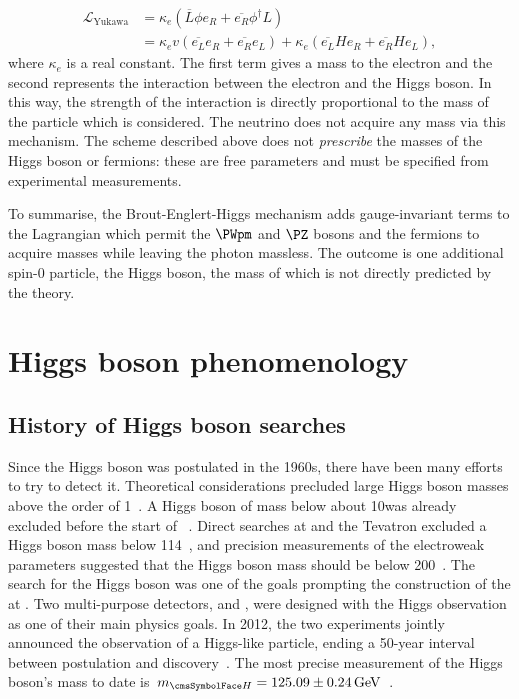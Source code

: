 \begin{equation}
\label{eq:th:yukawa_coupling}
\begin{split}
  \mathcal{L}_{\textrm{Yukawa}} &= \kappa_{e} (\overline{L} \phi  e_{R} + \overline{e_{R}} \phi^{\dagger} L )\\
                       &=  \kappa_{e} v (\overline{e_{L}} e_{R} + \overline{e_{R}} e_{L} ) +  \kappa_{e}   (\overline{e_{L}} H e_{R} + \overline{e_{R}} H e_{L} ),
\end{split}
\end{equation}
where $\kappa_{e}$ is a real constant. The first term gives a mass to the electron and the second represents the interaction between the electron and the Higgs boson. In this way, the strength of the interaction is directly proportional to the mass of the particle which is considered. The neutrino does not acquire any mass via this mechanism. The scheme described above does not \emph{prescribe} the masses of the Higgs boson or fermions: these are free parameters and must be specified from experimental measurements.

To summarise, the Brout-Englert-Higgs mechanism adds gauge-invariant terms to the \SM Lagrangian which permit the $\PWpm$ and $\PZ$ bosons and the fermions to acquire masses while leaving the photon massless. The outcome is one additional spin-0 particle, the Higgs boson, the mass of which is not directly predicted by the theory.

 
\section{Higgs boson phenomenology}
\subsection{History of Higgs boson searches}
\label{sec:th:higgs_searches}

Since the Higgs boson was postulated in the 1960s, there have been many efforts to try to detect it. Theoretical considerations precluded large Higgs boson masses above the order of 1\TeV~\cite{Heller:1993yv}. 
A Higgs boson of mass below about 10\GeV was already excluded before the start of \LEP~\cite{Wu:2014vva}.
Direct searches at \LEP and the Tevatron excluded a Higgs boson mass below 114\GeV~\cite{Barate:2003sz,TEVNPH:2012ab}, and precision measurements of the electroweak parameters suggested that the Higgs boson mass should be below 200\GeV~\cite{Renton:2004wd}. The search for the Higgs boson was one of the goals prompting the construction of the \LHC at \CERN. Two multi-purpose detectors, \ATLAS and \CMS, were designed with the Higgs observation as one of their main physics goals. In 2012, the two experiments jointly announced the observation of a Higgs-like particle, ending a 50-year interval between postulation and discovery~\cite{CMSHDisc,ATLASHDisc}. The most precise measurement of the Higgs boson's mass to date is $\mH=125.09\pm0.24\GeV$~\cite{PhysRevLett.114.191803}.

